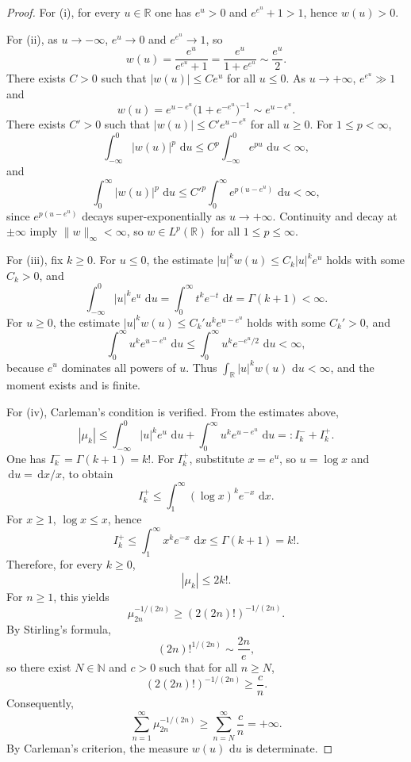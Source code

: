 \documentclass[11pt]{amsart}
\numberwithin{equation}{section}
\theoremstyle{definition}
\newcommand{\R}{\mathbb{R}}
\newcommand{\N}{\mathbb{N}}
\newcommand{\dd}{\,\mathrm{d}}
\newcommand{\mom}[1]{\mu_{#1}}
\begin{document}
\begin{proof}
For (i), for every $u\in\R$ one has $e^{u}>0$ and $e^{e^{u}}+1>1$, hence
$w(u)>0$.

For (ii), as $u\to -\infty$, $e^{u}\to 0$ and $e^{e^{u}}\to 1$, so
\[
w(u)=\frac{e^{u}}{e^{e^{u}}+1}
=\frac{e^{u}}{1+e^{e^{u}}}
\sim \frac{e^{u}}{2}.
\]
There exists $C>0$ such that $|w(u)|\le C e^{u}$ for all $u\le 0$. As
$u\to +\infty$, $e^{e^{u}}\gg 1$ and
\[
w(u)=e^{u-e^{u}}\bigl(1+e^{-e^{u}}\bigr)^{-1}
\sim e^{u-e^{u}}.
\]
There exists $C'>0$ such that $|w(u)|\le C' e^{u-e^{u}}$ for all $u\ge 0$.
For $1\le p<\infty$,
\[
\int_{-\infty}^{0}|w(u)|^{p}\,\dd u
\le C^{p}\int_{-\infty}^{0}e^{pu}\,\dd u<\infty,
\]
and
\[
\int_{0}^{\infty}|w(u)|^{p}\,\dd u
\le C'^{p}\int_{0}^{\infty}e^{p(u-e^{u})}\,\dd u<\infty,
\]
since $e^{p(u-e^{u})}$ decays super-exponentially as $u\to +\infty$.
Continuity and decay at $\pm\infty$ imply $\|w\|_{\infty}<\infty$, so
$w\in L^{p}(\R)$ for all $1\le p\le\infty$.

For (iii), fix $k\ge 0$. For $u\le 0$, the estimate
$|u|^{k}w(u)\le C_{k}|u|^{k}e^{u}$ holds with some $C_{k}>0$, and
\[
\int_{-\infty}^{0}|u|^{k}e^{u}\,\dd u
=\int_{0}^{\infty}t^{k}e^{-t}\,\dd t
=\Gamma(k+1)<\infty.
\]
For $u\ge 0$, the estimate $|u|^{k}w(u)\le C_{k}' u^{k}e^{u-e^{u}}$ holds
with some $C_{k}'>0$, and
\[
\int_{0}^{\infty}u^{k}e^{u-e^{u}}\,\dd u
\le \int_{0}^{\infty}u^{k}e^{-e^{u}/2}\,\dd u<\infty,
\]
because $e^{u}$ dominates all powers of $u$. Thus
$\int_{\R}|u|^{k}w(u)\,\dd u<\infty$, and the moment exists and is finite.

For (iv), Carleman's condition is verified. From the estimates above,
\[
|\mom{k}|
\le \int_{-\infty}^{0}|u|^{k}e^{u}\,\dd u
+ \int_{0}^{\infty}u^{k}e^{u-e^{u}}\,\dd u
=:I^{-}_{k}+I^{+}_{k}.
\]
One has $I^{-}_{k}=\Gamma(k+1)=k!$. For $I^{+}_{k}$, substitute $x=e^{u}$, so
$u=\log x$ and $\dd u=\dd x/x$, to obtain
\[
I^{+}_{k}\le \int_{1}^{\infty}(\log x)^{k}e^{-x}\,\dd x.
\]
For $x\ge 1$, $\log x\le x$, hence
\[
I^{+}_{k}\le \int_{1}^{\infty}x^{k}e^{-x}\,\dd x\le \Gamma(k+1)=k!.
\]
Therefore, for every $k\ge 0$,
\begin{equation}\label{eq:moment-bound}
|\mom{k}|\le 2k!.
\end{equation}
For $n\ge 1$, this yields
\[
\mom{2n}^{-1/(2n)}\ge (2(2n)!)^{-1/(2n)}.
\]
By Stirling's formula,
\[
(2n)!^{1/(2n)}\sim \frac{2n}{e},
\]
so there exist $N\in\N$ and $c>0$ such that for all $n\ge N$,
\[
(2(2n)!)^{-1/(2n)}\ge \frac{c}{n}.
\]
Consequently,
\[
\sum_{n=1}^{\infty}\mom{2n}^{-1/(2n)}
\ge \sum_{n=N}^{\infty}\frac{c}{n}=+\infty.
\]
By Carleman's criterion, the measure $w(u)\,\dd u$ is determinate.
\end{proof}
\end{document}
